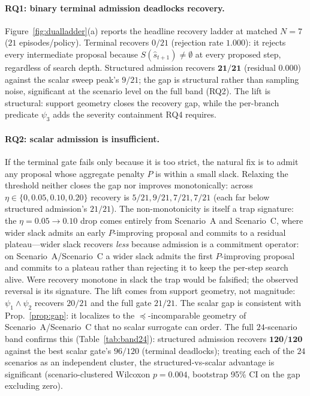 \documentclass[letterpaper]{article} %
\theoremstyle{plain}
\newcommand{\psione}{\psi_1}
\newcommand{\psitwo}{\psi_2}
\newcommand{\psithree}{\psi_3}
\begin{document}
\paragraph{RQ1: binary terminal admission deadlocks recovery.}
Figure~\ref{fig:dualladder}(a) reports the headline recovery ladder at matched $N{=}7$ ($21$ episodes/policy). Terminal recovers $0/21$ (rejection rate $1.000$): it rejects every intermediate proposal because $S(\hat{s}_{t+1})\ne\emptyset$ at every proposed step, regardless of search depth. Structured admission recovers $\mathbf{21/21}$ (residual $0.000$) against the scalar sweep peak's $9/21$; the gap is structural rather than sampling noise, significant at the scenario level on the full band (RQ2). The lift is structural: support geometry closes the recovery gap, while the per-branch predicate $\psithree$ adds the severity containment RQ4 requires.

\paragraph{RQ2: scalar admission is insufficient.}
If the terminal gate fails only because it is too strict, the natural fix is to admit any proposal whose aggregate penalty $P$ is within a small slack. Relaxing the threshold neither closes the gap nor improves monotonically: across $\eta\in\{0,0.05,0.10,0.20\}$ recovery is $5/21,9/21,7/21,7/21$ (each far below structured admission's $21/21$). The non-monotonicity is itself a trap signature: the $\eta{=}0.05\!\to\!0.10$ drop comes entirely from Scenario~A and Scenario~C, where wider slack admits an early $P$-improving proposal and commits to a residual plateau---wider slack recovers \emph{less} because admission is a commitment operator: on Scenario~A/Scenario~C a wider slack admits the first $P$-improving proposal and commits to a plateau rather than rejecting it to keep the per-step search alive. Were recovery monotone in slack the trap would be falsified; the observed reversal is its signature. The lift comes from support geometry, not magnitude: $\psione\wedge\psitwo$ recovers $20/21$ and the full gate $21/21$. The scalar gap is consistent with Prop.~\ref{prop:gap}: it localizes to the $\preceq$-incomparable geometry of Scenario~A/Scenario~C that no scalar surrogate can order. The full $24$-scenario band confirms this (Table~\ref{tab:band24}): structured admission recovers $\mathbf{120/120}$ against the best scalar gate's $96/120$ (terminal deadlocks); treating each of the $24$ scenarios as an independent cluster, the structured-vs-scalar advantage is significant (scenario-clustered Wilcoxon $p{=}0.004$, bootstrap 95\% CI on the gap excluding zero).
\end{document}
